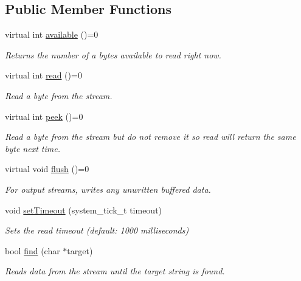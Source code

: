 \subsection*{Public Member Functions}
\begin{DoxyCompactItemize}
\item 
virtual int \mbox{\hyperlink{class_stream_a9c98a763395005c08ce95afb2f06c7b1}{available}} ()=0
\begin{DoxyCompactList}\small\item\em Returns the number of a bytes available to read right now. \end{DoxyCompactList}\item 
virtual int \mbox{\hyperlink{class_stream_aea5dee9fcb038148515b7c9212d38dc0}{read}} ()=0
\begin{DoxyCompactList}\small\item\em Read a byte from the stream. \end{DoxyCompactList}\item 
virtual int \mbox{\hyperlink{class_stream_a30c3c212ec6ea67277a708c5ea2501a5}{peek}} ()=0
\begin{DoxyCompactList}\small\item\em Read a byte from the stream but do not remove it so read will return the same byte next time. \end{DoxyCompactList}\item 
\mbox{\label{class_stream_aa3ef2c34f152a0b2ea8de9139b9461da}} 
virtual void \mbox{\hyperlink{class_stream_aa3ef2c34f152a0b2ea8de9139b9461da}{flush}} ()=0
\begin{DoxyCompactList}\small\item\em For output streams, writes any unwritten buffered data. \end{DoxyCompactList}\item 
void \mbox{\hyperlink{class_stream_abaa50647d6dbb3baf7697a2691a06177}{set\+Timeout}} (system\+\_\+tick\+\_\+t timeout)
\begin{DoxyCompactList}\small\item\em Sets the read timeout (default\+: 1000 milliseconds) \end{DoxyCompactList}\item 
bool \mbox{\hyperlink{class_stream_a4bab30ccd324efd461dee46a2339f673}{find}} (char $\ast$target)
\begin{DoxyCompactList}\small\item\em Reads data from the stream until the target string is found. \end{DoxyCompactList}\item 

\end{DoxyCompactItemize}
